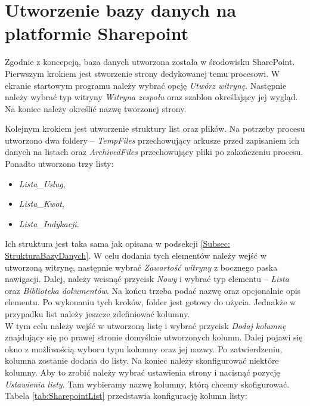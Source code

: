 \section{Utworzenie bazy danych na platformie Sharepoint}

Zgodnie z koncepcją, baza danych utworzona została w środowisku SharePoint.
Pierwszym krokiem jest stworzenie strony dedykowanej temu procesowi. W ekranie startowym programu należy wybrać opcję \emph{Utwórz witrynę}. Następnie należy wybrać typ witryny \emph{Witryna zespołu} oraz szablon określający jej wygląd. Na koniec należy określić nazwę tworzonej strony.

Kolejnym krokiem jest utworzenie struktury list oraz plików. Na potrzeby procesu utworzono dwa foldery -- \emph{TempFiles} przechowujący arkusze przed zapisaniem ich danych na listach oraz \emph{ArchivedFiles} przechowujący pliki po zakończeniu procesu.
Ponadto utworzono trzy listy:
\begin{itemize}
    \item \emph{Lista\_Uslug},
    \item \emph{Lista\_Kwot},
    \item \emph{Lista\_Indykacji}.
\end{itemize}
Ich struktura jest taka sama jak opisana w podsekcji \ref{Subsec: StrukturaBazyDanych}. 
W celu dodania tych elementów należy wejść w utworzoną witrynę, następnie wybrać \emph{Zawartość witryny} z bocznego paska nawigacji. Dalej, należy wcisnąć przycisk \emph{Nowy} i wybrać typ elementu -- \emph{Lista} oraz \emph{Biblioteka dokumentów}. Na końcu trzeba podać nazwę oraz opcjonalnie opis elementu.
Po wykonaniu tych kroków, folder jest gotowy do użycia. Jednakże w przypadku list należy jeszcze zdefiniować kolumny. \\W tym celu należy wejść w utworzoną listę i wybrać przycisk \emph{Dodaj kolumnę} znajdujący się po prawej stronie domyślnie utworzonych kolumn. Dalej pojawi się okno z możliwością wyboru typu kolumny oraz jej nazwy. Po zatwierdzeniu, kolumna zostanie dodana do listy.
Na koniec należy skonfigurować niektóre kolumny. Aby to zrobić należy wybrać ustawienia strony i nacisnąć pozycję \emph{Ustawienia listy}. Tam wybieramy nazwę kolumny, którą chcemy skofigurować.\\
Tabela \ref{tab:SharepointList} przedstawia konfigurację kolumn listy:
